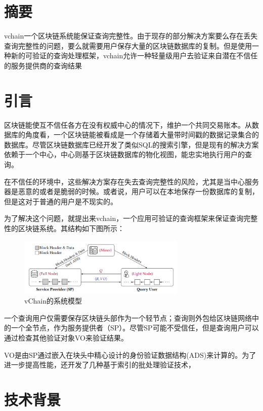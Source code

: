 \documentclass{article}
\begin{document}
    

\section{摘要}

vchain一个区块链系统能保证查询完整性。由于现存的部分解决方案要么存在丢失查询完整性的问题，要么就需要用户保存大量的区块链数据库的复制。但是使用一种新的可验证的查询处理框架，vchain允许一种轻量级用户去验证来自潜在不信任的服务提供商的查询结果



\section{引言}

区块链能使互不信任各方在没有权威中心的情况下，维护一个共同交易账本。从数据库的角度看，一个区块链能被看成是一个存储着大量带时间戳的数据记录集合的数据库。尽管区块链数据库已经开发了类似SQL的搜索引擎，但是现有的解决方案依赖于一个中心，中心则基于区块链数据库的物化视图，能忠实地执行用户的查询。

在不信任的环境中，这些解决方案存在失去查询完整性的风险，尤其是当中心服务器是恶意的或者是脆弱的时候。或者说，用户可以在本地保存一份数据库的复制，但是这对于普通的用户是不现实的。

为了解决这个问题，就提出来vchain，一个应用可验证的查询框架来保证查询完整性的区块链系统。其结构如下图所示：

\begin{figure}[H]
    \centering
    \includegraphics[width = 8cm]{img/vchain-1.png}
    \caption{vChain的系统模型}
\end{figure}

一个查询用户仅需要保存区块链头部作为一个轻节点；查询则外包给区块链网络中的一个全节点，作为服务提供者（SP）。尽管SP可能不受信任，但是查询用户可以通过检查其他验证对象VO来验证结果。

VO是由SP通过嵌入在块头中精心设计的身份验证数据结构(ADS)来计算的。为了进一步提高性能，还开发了几种基于索引的批处理验证技术，

\section{技术背景}
\end{document}
